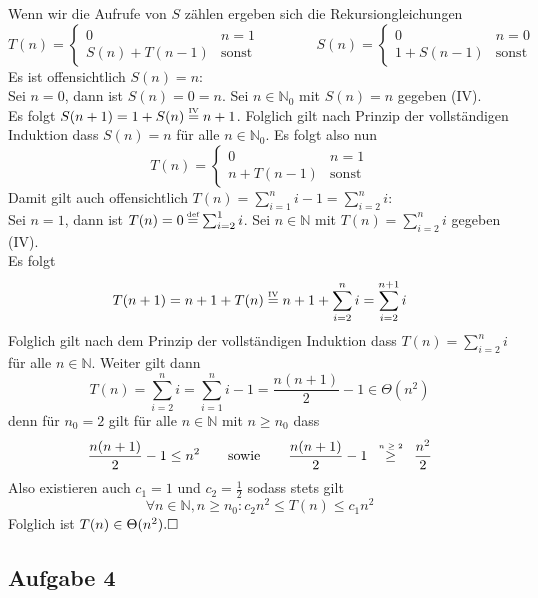\documentclass[a4paper,graphics,11pt]{article}
\newcommand{\aufgabe}[1]{\subsection*{Aufgabe #1}}
\newcommand{\up}[2]{\mathrel{\overset{\makebox[0pt]{\mbox{\normalfont\tiny #2}}}{#1}}}
\begin{document}
Wenn wir die Aufrufe von $S$ zählen ergeben sich die Rekursiongleichungen
$$
    T(n) = \begin{cases}
        0 & n = 1\\
        S(n) + T(n-1)& \text{sonst}
    \end{cases}
    \qquad\qquad
    S(n) = \begin{cases}
        0 & n = 0\\
        1 + S(n-1)& \text{sonst}
    \end{cases}
$$
Es ist offensichtlich $S(n) = n$:\\
Sei $n = 0$, dann ist $S(n) = 0 = n$. Sei $n \in \mathbb{N}_0$ mit $S(n) = n$ gegeben (IV).\\
Es folgt $S(n+1) = 1 + S(n) \up{=}{IV} n+1$. Folglich gilt nach Prinzip der vollständigen Induktion
dass $S(n) = n$ für alle $n \in \mathbb{N}_0$.
Es folgt also nun
$$
    T(n) = \begin{cases}
        0 & n = 1\\
        n + T(n-1)& \text{sonst}
    \end{cases}
$$
\newpage
Damit gilt auch offensichtlich $T(n) = \sum_{i=1}^{n} i - 1 = \sum_{i=2}^{n} i$:\\
Sei $n = 1$, dann ist $T(n) = 0 \up{=}{def} \sum_{i=2}^{1} i$.
Sei $n \in \mathbb{N}$ mit $T(n) = \sum_{i=2}^{n} i$ gegeben (IV).\\
Es folgt
$$
    T(n+1) = n+1 + T(n)
    \up{=}{IV} n+1 + \sum_{i=2}^{n} i
    = \sum_{i=2}^{n+1} i
$$
Folglich gilt nach dem Prinzip der vollständigen Induktion dass $T(n) = \sum_{i=2}^{n} i$ für alle $n \in \mathbb{N}$.
Weiter gilt dann
$$
    T(n) = \sum_{i=2}^{n} i = \sum_{i=1}^{n} i - 1 = \frac{n(n+1)}{2} - 1 \in \Theta(n^2)
$$
denn für $n_0 = 2$ gilt für alle $n \in \mathbb{N}$ mit $n \geq n_0$ dass
$$
    \frac{n(n+1)}{2} -1 \leq n^2
    \qquad\text{sowie}\qquad
    \frac{n(n+1)}{2} -1
    \quad\up{\geq}{$n\geq 2$}\quad \frac{n^2}{2}
$$
Also existieren auch $c_1 = 1$ und $c_2 = \frac{1}{2}$ sodass stets gilt
$$
    \forall n \in \mathbb{N}, n\geq n_0 : c_2n^2 \leq T(n) \leq c_1n^2
$$
Folglich ist $T(n) \in \Theta(n^2).\hfill\square$
\aufgabe{4}
\end{document}
